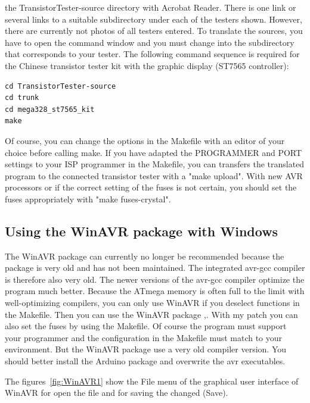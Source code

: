 the TransistorTester-source directory with Acrobat Reader.
There is one link or several links to a suitable subdirectory under each of the testers shown.
However, there are currently not photos of all testers entered.
To translate the sources, you have to open the command window and you must change into the subdirectory
that corresponds to your tester.
The following command sequence is required for the Chinese transistor tester kit with the graphic display (ST7565 controller): 
\begin{verbatim}
cd TransistorTester-source
cd trunk
cd mega328_st7565_kit
make
\end{verbatim}
Of course, you can change the options in the Makefile with an editor of your choice before calling make.
If you have adapted the PROGRAMMER and PORT settings to your ISP programmer in the Makefile, you can transfers
the translated program to the connected transistor tester with a "make upload".
With new AVR processors or if the correct setting of the fuses is not certain,
you should set the fuses appropriately with "make fuses-crystal". 

\subsection{Using the WinAVR package with Windows}
The WinAVR package can currently no longer be recommended because the package is very old and has not been maintained.
The integrated avr-gcc compiler is therefore also very old.
The newer versions of the avr-gcc compiler optimize the program much better.
Because the ATmega memory is often full to the limit with well-optimizing compilers,
you can only use WinAVR if you deselect functions in the Makefile. 
Then you can use the WinAVR package \cite{winavr1},\cite{winavr2}.
With my patch \cite{winavr3} you can also set the fuses by using the Makefile.
Of course the  program must support your programmer and the configuration
in the Makefile must match to your environment.
But the WinAVR package use a very old compiler version. You should better install
the Arduino package and overwrite the avr executables.

The figures~\ref{fig:WinAVR1} show the File menu of the graphical user interface of WinAVR for
open the file  and for saving the changed  (Save).

